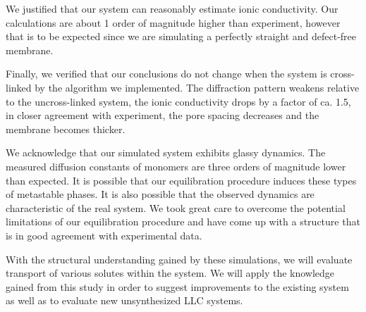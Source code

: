 \documentclass[journal=jpcbfk,manusciprt=article]{achemso}
\begin{document}
  We justified that our system can reasonably estimate ionic conductivity.  Our
  calculations are about 1 order of magnitude higher than experiment, however
  that is to be expected since we are simulating a perfectly straight and
  defect-free membrane. 

  Finally, we verified that our conclusions do not change when the system is
  cross-linked by the algorithm we implemented. The diffraction pattern weakens
  relative to the uncross-linked system, the ionic conductivity drops by a factor
  of ca. 1.5, in closer agreement with experiment, the pore spacing decreases and
  the membrane becomes thicker. 

  We acknowledge that our simulated system exhibits glassy dynamics. The
  measured diffusion constants of monomers are three orders of magnitude lower
  than expected. It is possible that our equilibration procedure induces these
  types of metastable phases. It is also possible that the observed dynamics are
  characteristic of the real system. We took great care to overcome the potential
  limitations of our equilibration procedure and have come up with a structure
  that is in good agreement with experimental data.

  With the structural understanding gained by these simulations, we will
  evaluate transport of various solutes within the system. We will apply the
  knowledge gained from this study in order to suggest improvements to the
  existing system as well as to evaluate new unsynthesized LLC systems.

  \clearpage
  
\end{document}
